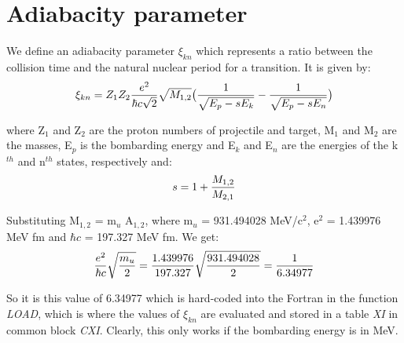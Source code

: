 \chapter{Adiabacity parameter}
\label{chapt:adiabacity}

We define an adiabacity parameter $\xi_{kn}$ which represents a ratio
between the collision time and the natural nuclear period for a transition.
It is given by:\\

\begin{equation}
\xi_{kn} = Z_1 Z_2 {e^2 \over \hbar c \sqrt{2}}  \sqrt{M_{1,2}}
\big(
{1 \over \sqrt{E_p -s E_k}} - {1 \over \sqrt{E_p -s E_n}}
\big)
\end{equation}

where Z$_1$ and Z$_2$ are the proton numbers of projectile and target, M$_1$
and M$_2$ are the masses, E$_p$ is the bombarding energy and E$_k$ and E$_n$
are the energies of the k$^{th}$ and n$^{th}$ states, respectively and:\\

\begin{equation}
s = 1 + {M_{1,2} \over M_{2,1}}
\end{equation}

Substituting M$_{1,2}$ = m$_u$ A$_{1,2}$, where m$_u$ = 931.494028
MeV/c$^2$, e$^2$ = 1.439976 MeV fm and $\hbar c$ = 197.327 MeV fm. We get:\\

\begin{equation}
{e^2 \over \hbar c}\sqrt{m_u \over 2} = {1.439976 \over 197.327}
\sqrt{931.494028 \over 2} = {1 \over 6.34977}
\end{equation}

So it is this value of 6.34977 which is hard-coded into the Fortran in the
function {\em LOAD}, which is where the values of $\xi_{kn}$ are evaluated
and stored in a table {\em XI} in common block {\em CXI}. Clearly, this only
works if the bombarding energy is in MeV.\\

